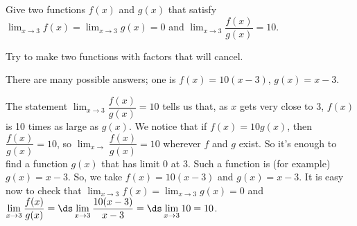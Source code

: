 \begin{Mquestion}\label{s1.4zeroes1}
Give two functions $f(x)$ and $g(x)$ that satisfy $\displaystyle\lim_{x \rightarrow 3}f(x)=\displaystyle\lim_{x \rightarrow 3}g(x)=0$ and $\displaystyle\lim_{x \rightarrow 3} \dfrac{f(x)}{g(x)}=10$.
\end{Mquestion}
\begin{hint} Try to make two functions with factors that will cancel.
\end{hint}
\begin{answer}
There are many possible answers; one is $f(x)=10(x-3)$, $g(x)=x-3$.
\end{answer}
\begin{solution}
The statement $\displaystyle\lim_{x \rightarrow 3} \dfrac{f(x)}{g(x)}=10$ tells us that, as $x$ gets very close to 3, $f(x)$ is 10 times as large as $g(x)$. We notice that if $f(x)=10g(x)$, then $\dfrac{f(x)}{g(x)}=10$, so $\displaystyle\lim_{x \rightarrow} \dfrac{f(x)}{g(x)}=10$ wherever $f$ and $g$ exist. So it's enough to find a function $g(x)$ that has limit 0 at 3. Such a function is (for example) $g(x)=x-3$. So, we take $f(x)=10(x-3)$ and $g(x)=x-3$. It is easy now to check that $\displaystyle\lim_{x \rightarrow 3}f(x)=\displaystyle\lim_{x \rightarrow 3}g(x)=0$ and $\displaystyle\lim_{x \rightarrow 3} \dfrac{f(x)}{g(x)}=\ds\lim_{x \to 3}\frac{10(x-3)}{x-3}=\ds\lim_{x \to 3}10=10$.
\end{solution}

